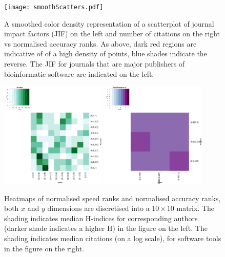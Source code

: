 \documentclass[fleqn,10pt]{SelfArx} %
\begin{document}
\begin{figure}[H]
\centering
\texttt{[image: smoothScatters.pdf]}
\caption{A smoothed color density representation of a scatterplot of
  journal impact factors (JIF) on the left and number of citations on
  the right vs normalised accuracy ranks. As above, dark red regions
  are indicative of of a high density of points, blue shades indicate
  the reverse. The JIF for journals that are major publishers of
  bioinformatic software are indicated on the left. }
\label{fig:smoothScatters}
\end{figure}



\begin{figure}[H]
\centering
\includegraphics[width=0.45\textwidth]{hindex-SpeedVsAccuracy-heatmap.pdf}
\includegraphics[width=0.45\textwidth]{cites-SpeedVsAccuracy-heatmap.pdf}
\caption{Heatmaps of normalised speed ranks and normalised accuracy
  ranks, both $x$ and $y$ dimensions are discretised into a $10 \times
  10$ matrix. The shading indicates median H-indices for corresponding
  authors (darker shade indicates a higher H) in the figure on the
  left. The shading indicates median citations (on a log scale), for
  software tools in the figure on the right. }
\label{fig:heatmaps}
\end{figure}
\end{document}
